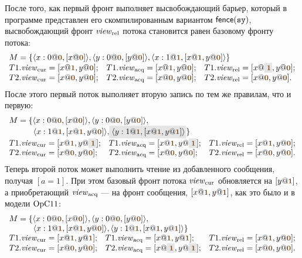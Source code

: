 После того, как первый фронт выполняет высвобождающий барьер, который в программе представлен его скомпилированным
вариантом $\mathsf{fence}({\mathtt{sy}})$, высвобождающий фронт $\mathit{view}_{\mathrm{rel}}$ потока становится равен базовому фронту потока:
\[
\begin{array}{l l l}
\multicolumn{3}{l}{M = \{\angled{x:0@\tstamp{0}, [x@\tstamp{0}]}, \angled{y:0@\tstamp{0}, [y@\tstamp{0}]},
  \angled{x:1@\tstamp{1}, [x@\tstamp{1}, y@\tstamp{0}]} \}} \\
T1.\Rcur = [x@\tstamp{1}, y@\tstamp{0}];           &
T1.\Racq = [x@\tstamp{1}, y@\tstamp{0}];           &
T1.\Rrel = [x@\graybox{\tstamp{1}}, y@\tstamp{0}]; \\
T2.\Rcur = [x@\tstamp{0}, y@\tstamp{0}]; &
T2.\Racq = [x@\tstamp{0}, y@\tstamp{0}]; &
T2.\Rrel = [x@\tstamp{0}, y@\tstamp{0}]. \\
\end{array}
\]
После этого первый поток выполняет вторую запись по тем же правилам, что и первую:
\[
\begin{array}{l l l}
\multicolumn{3}{l}{M = \{\angled{x:0@\tstamp{0}, [x@\tstamp{0}]}, \angled{y:0@\tstamp{0}, [y@\tstamp{0}]},} \\
\multicolumn{3}{l}{
\quad \quad \quad \angled{x:1@\tstamp{1}, [x@\tstamp{1}, y@\tstamp{0}]}, \graybox{\angled{y:1@\tstamp{1}, [x@\tstamp{1}, y@\tstamp{1}]}} \}} \\
T1.\Rcur = [x@\tstamp{1}, y@\graybox{\tstamp{1}}]; &
T1.\Racq = [x@\tstamp{1}, y@\graybox{\tstamp{1}}]; &
T1.\Rrel = [x@\tstamp{1}, y@\tstamp{0}]; \\
T2.\Rcur = [x@\tstamp{0}, y@\tstamp{0}]; &
T2.\Racq = [x@\tstamp{0}, y@\tstamp{0}]; &
T2.\Rrel = [x@\tstamp{0}, y@\tstamp{0}]. \\
\end{array}
\]
Теперь второй поток может выполнить чтение из добавленного сообщения, получая $[a = 1]$.
При этом базовый фронт потока $\mathit{view}_{\mathrm{cur}}$ обновляется на $[y@\tstamp{1}]$, а приобретающий $\mathit{view}_{\mathrm{acq}}$ --- на фронт сообщения,
$[x@\tstamp{1}, y@\tstamp{1}]$, как это было и в модели $\mathrm{OpC11}$:
\[
\begin{array}{l l l}
\multicolumn{3}{l}{M = \{\angled{x:0@\tstamp{0}, [x@\tstamp{0}]}, \angled{y:0@\tstamp{0}, [y@\tstamp{0}]},} \\
\multicolumn{3}{l}{
\quad \quad \quad \angled{x:1@\tstamp{1}, [x@\tstamp{1}, y@\tstamp{0}]}, \angled{y:1@\tstamp{1}, [x@\tstamp{1}, y@\tstamp{1}]} \}} \\
T1.\Rcur = [x@\tstamp{1}, y@\tstamp{1}]; &
T1.\Racq = [x@\tstamp{1}, y@\tstamp{1}]; &
T1.\Rrel = [x@\tstamp{1}, y@\tstamp{0}]; \\
T2.\Rcur = [x@\tstamp{0}, y@\tstamp{0}]; &
T2.\Racq = [x@\graybox{\tstamp{1}}, y@\graybox{\tstamp{1}}]; &
T2.\Rrel = [x@\tstamp{0}, y@\tstamp{0}]. \\
\end{array}
\]
